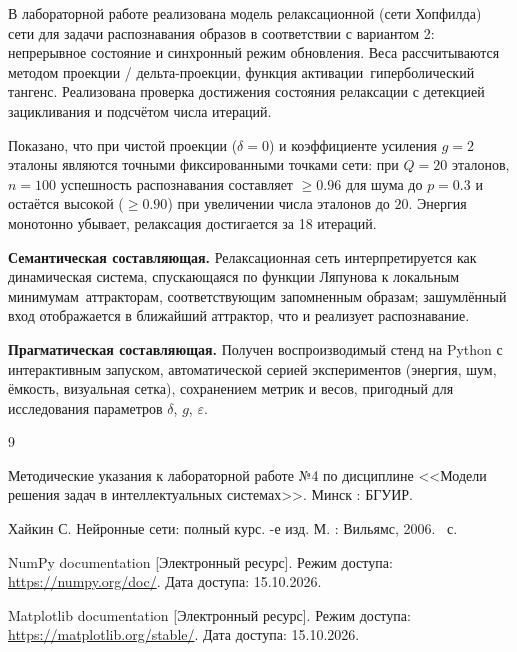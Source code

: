 
В лабораторной работе реализована модель релаксационной (сети Хопфилда) сети для задачи распознавания образов в соответствии с вариантом 2: непрерывное состояние и синхронный режим обновления. Веса рассчитываются методом проекции / дельта-проекции, функция активации~\mdash  гиперболический тангенс. Реализована проверка достижения состояния релаксации с детекцией зацикливания и подсчётом числа итераций.

Показано, что при чистой проекции ($\delta = 0$) и коэффициенте усиления $g = 2$ эталоны являются точными фиксированными точками сети: при $Q = 20$ эталонов, $n = 100$ успешность распознавания составляет $\ge 0.96$ для шума до $p = 0.3$ и остаётся высокой ($\ge 0.90$) при увеличении числа эталонов до $20$. Энергия монотонно убывает, релаксация достигается за 18 итераций.

\textbf{Семантическая составляющая.} Релаксационная сеть интерпретируется как динамическая система, спускающаяся по функции Ляпунова к локальным минимумам~\mdash  аттракторам, соответствующим запомненным образам; зашумлённый вход отображается в ближайший аттрактор, что и реализует распознавание.

\textbf{Прагматическая составляющая.} Получен воспроизводимый стенд на Python с интерактивным запуском, автоматической серией экспериментов (энергия, шум, ёмкость, визуальная сетка), сохранением метрик и весов, пригодный для исследования параметров $\delta$, $g$, $\varepsilon$.

\begin{thebibliography}{9}

	Методические указания к лабораторной работе №4 по дисциплине <<Модели решения задач в интеллектуальных системах>>. \mdash  Минск : БГУИР.

	Хайкин С. Нейронные сети: полный курс. -е изд. \mdash  М. : Вильямс, 2006. ~с.

	NumPy documentation [Электронный ресурс]. \mdash  Режим доступа: \url{https://numpy.org/doc/}. \mdash  Дата доступа: 15.10.2026.

	Matplotlib documentation [Электронный ресурс]. \mdash  Режим доступа: \url{https://matplotlib.org/stable/}. \mdash  Дата доступа: 15.10.2026.
\end{thebibliography}
